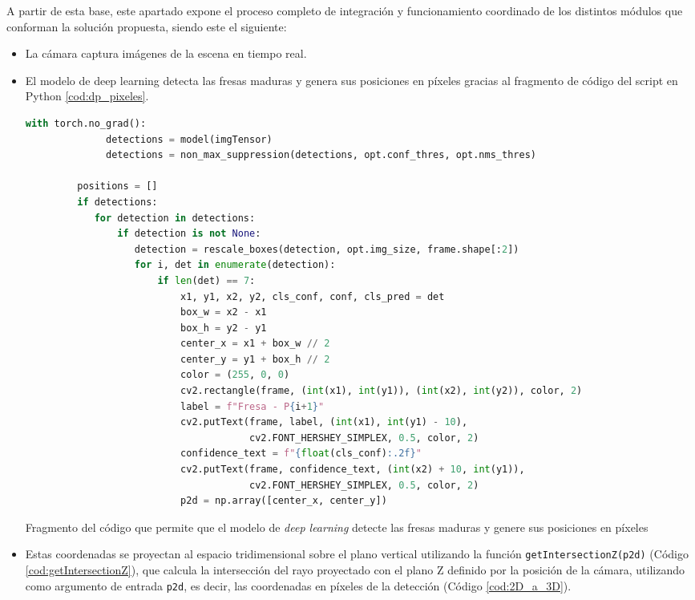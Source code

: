 A partir de esta base, este apartado expone el proceso completo de integración y funcionamiento coordinado de los distintos módulos que conforman la solución propuesta, siendo este el siguiente:

\begin{itemize}
  \item La cámara captura imágenes de la escena en tiempo real.
  \item El modelo de deep learning detecta las fresas maduras y genera sus posiciones en píxeles gracias al fragmento de código del script en Python \ref{cod:dp_pixeles}.    
    \begin{code}[H]
      \begin{lstlisting}[language=Python] 
         with torch.no_grad():
              detections = model(imgTensor)
              detections = non_max_suppression(detections, opt.conf_thres, opt.nms_thres)

         positions = []
         if detections:
            for detection in detections:
                if detection is not None:
                   detection = rescale_boxes(detection, opt.img_size, frame.shape[:2])
                   for i, det in enumerate(detection):
                       if len(det) == 7:  
                           x1, y1, x2, y2, cls_conf, conf, cls_pred = det
                           box_w = x2 - x1
                           box_h = y2 - y1
                           center_x = x1 + box_w // 2
                           center_y = y1 + box_h // 2
                           color = (255, 0, 0)
                           cv2.rectangle(frame, (int(x1), int(y1)), (int(x2), int(y2)), color, 2)
                           label = f"Fresa - P{i+1}"
                           cv2.putText(frame, label, (int(x1), int(y1) - 10),
                                       cv2.FONT_HERSHEY_SIMPLEX, 0.5, color, 2)
                           confidence_text = f"{float(cls_conf):.2f}"
                           cv2.putText(frame, confidence_text, (int(x2) + 10, int(y1)),
                                       cv2.FONT_HERSHEY_SIMPLEX, 0.5, color, 2)
                           p2d = np.array([center_x, center_y])            
      \end{lstlisting}
      \caption{Fragmento del código que permite que el modelo de \textit{deep learning} detecte las fresas maduras y genere sus posiciones en píxeles}
      \label{cod:dp_pixeles}
    \end{code}

  \item Estas coordenadas se proyectan al espacio tridimensional sobre el plano vertical utilizando la función \texttt{getIntersectionZ(p2d)} (Código \ref{cod:getIntersectionZ}), que calcula la intersección del rayo proyectado con el plano Z definido por la posición de la cámara, utilizando como argumento de entrada \texttt{p2d}, es decir, las coordenadas en píxeles de la detección (Código \ref{cod:2D_a_3D}).
 

\end{itemize}
